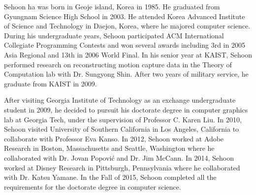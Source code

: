Sehoon ha was born in Geoje island, Korea in 1985.
He graduated from Gyungnam Science High School in 2003.
He attended Korea Advanced Institute of Science and Technology in Daejon,
Korea, where he majored computer science.
During his undergraduate years, Sehoon participated ACM International
Collegiate Programming Contests and won several awards including
3rd in 2005 Asia Regional and 13th in 2006 World Final.
In his senior year at KAIST, Sehoon performed research on reconstructing motion
capture data in the Theory of Computation lab with Dr. Sungyong Shin.
After two years of military service, he graduate from KAIST in 2009.

After visiting Georgia Institute of Technology as an exchange undergraduate
student in 2009, he decided to pursuit his doctorate degree in computer
graphics lab at Georgia Tech, under the supervision of Professor C. Karen Liu.
In 2010, Sehoon visited University of Southern California in Los Angeles,
California to collaborate with Professor Eva Kanso.
In 2012, Sehoon worked at Adobe Research in Boston, Massachusetts and Seattle,
Washington where he collaborated with Dr. Jovan Popovi\'{c}
and Dr. Jim McCann. 
In 2014, Sehoon worked at Disney Research in Pittsburgh, Pennsylvania where he
collaborated with Dr. Katsu Yamane.
In the Fall of 2015, Sehoon completed all the requirements for the doctorate
degree in computer science.


